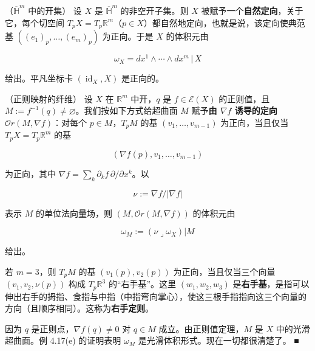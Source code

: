 \begin{example}

\begin{items}
\item

（$ \overline{\mathbb{H}}^m $ 中的开集） 设 $ X $ 是 $ \overline{\mathbb{H}}^m $ 的非空开子集。则 $ X $ 被赋予一个\textbf{自然定向}，关于它，每个切空间 $ T_p X = T_p\mathbb{R}^m $（$ p \in X $）都自然地定向，也就是说，该定向使典范基 $ ((e_1)_p, \ldots, (e_m)_p) $ 为正向。于是 $ X $ 的体积元由

\[
\omega_X = dx^1 \wedge \cdots \wedge dx^m \,|\, X
\]

给出。平凡坐标卡 $ (\operatorname{id}_X, X) $ 是正向的。

\item

（正则映射的纤维） 设 $ X $ 在 $ \mathbb{R}^m $ 中开，$ q $ 是 $ f \in \mathcal{E}(X) $ 的正则值，且 $ M := f^{-1}(q) \ne \varnothing $。我们按如下方式给超曲面 $ M $ 赋予\textbf{由 $ \nabla f $ 诱导的定向 $ \mathcal{O}r(M, \nabla f) $}：对每个 $ p \in M $，$ T_p M $ 的基 $ (v_1, \ldots, v_{m-1}) $ 为正向，当且仅当 $ T_p X = T_p\mathbb{R}^m $ 的基

\[
(\nabla f(p), v_1, \ldots, v_{m-1})
\]

为正向，其中 $ \nabla f = \sum_{k} \partial_k f\, \partial/\partial x^k $。以

\[
\nu := \nabla f/|\nabla f|
\]

表示 $ M $ 的单位法向量场，则 $ (M, \mathcal{O}r(M, \nabla f)) $ 的体积元由

\[
\omega_M := (\nu \lrcorner \omega_X)|M
\]

给出。

\end{items}


若 $ m = 3 $，则 $ T_p M $ 的基 $ (v_1(p), v_2(p)) $ 为正向，当且仅当三个向量 $ (v_1, v_2, \nu(p)) $ 构成 $ T_p\mathbb{R}^3 $ 的“右手基”。这里 $ (w_1, w_2, w_3) $ 是\textbf{右手基}，是指可以伸出右手的拇指、食指与中指（中指弯向掌心），使这三根手指指向这三个向量的方向（且顺序相同）。这称为\textbf{右手定则}。

\proofhead
因为 $ q $ 是正则点，$ \nabla f(q) \ne 0 $ 对 $ q \in M $ 成立。由正则值定理，$ M $ 是 $ X $ 中的光滑超曲面。例 4.17(e) 的证明表明 $ \omega_M $ 是光滑体积形式。现在一切都很清楚了。 \nobreak\hspace{0.35em}■


\end{example}
